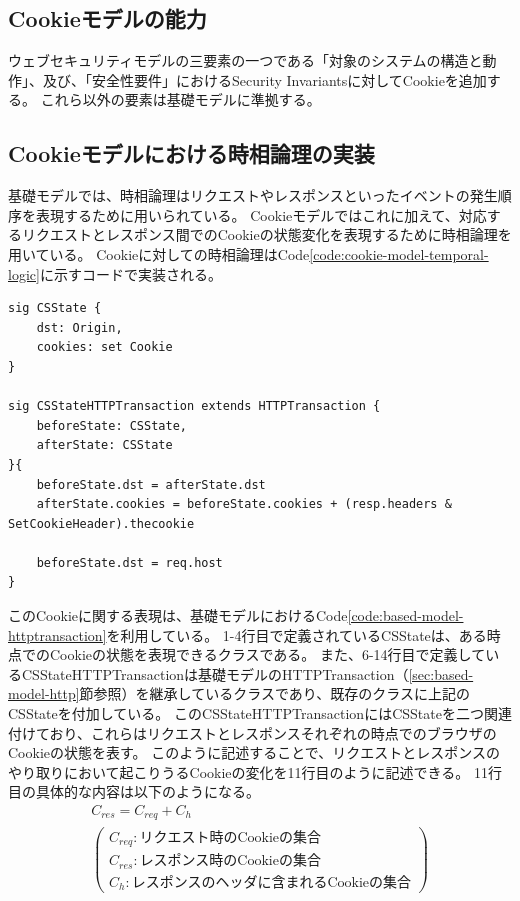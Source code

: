 \documentclass[12pt,a4paper]{jbook}
\begin{document}
\subsection{Cookieモデルの能力}
\color{red}
ウェブセキュリティモデルの三要素の一つである「対象のシステムの構造と動作」、及び、「安全性要件」におけるSecurity Invariantsに対してCookieを追加する。
これら以外の要素は基礎モデル\cite{based-model}に準拠する。
\color{black}

\subsection{Cookieモデルにおける時相論理の実装}
基礎モデルでは、時相論理はリクエストやレスポンスといったイベントの発生順序を表現するために用いられている。
Cookieモデルではこれに加えて、対応するリクエストとレスポンス間でのCookieの状態変化を表現するために時相論理を用いている。
Cookieに対しての時相論理はCode\ref{code:cookie-model-temporal-logic}に示すコードで実装される。
\begin{lstlisting}[caption=Cookieに対する時相論理, label=code:cookie-model-temporal-logic]
sig CSState {
	dst: Origin,
	cookies: set Cookie
}

sig CSStateHTTPTransaction extends HTTPTransaction {
	beforeState: CSState,
	afterState: CSState
}{
	beforeState.dst = afterState.dst
	afterState.cookies = beforeState.cookies + (resp.headers & SetCookieHeader).thecookie
	
	beforeState.dst = req.host
}
\end{lstlisting}
このCookieに関する表現は、基礎モデルにおけるCode\ref{code:based-model-httptransaction}を利用している。
1-4行目で定義されているCSStateは、ある時点でのCookieの状態を表現できるクラスである。
また、6-14行目で定義しているCSStateHTTPTransactionは基礎モデルのHTTPTransaction（\ref{sec:based-model-http}節参照）を継承しているクラスであり、既存のクラスに上記のCSStateを付加している。
このCSStateHTTPTransactionにはCSStateを二つ関連付けており、これらはリクエストとレスポンスそれぞれの時点でのブラウザのCookieの状態を表す。
このように記述することで、リクエストとレスポンスのやり取りにおいて起こりうるCookieの変化を11行目のように記述できる。
11行目の具体的な内容は以下のようになる。
\begin{eqnarray*}
& C_{res} = C_{req} + C_{h} &\\
& \left(
\begin{array}{l}
	C_{req} : \mbox{リクエスト時のCookieの集合}\\
	C_{res} : \mbox{レスポンス時のCookieの集合}\\
	C_{h} : \mbox{レスポンスのヘッダに含まれるCookieの集合}
\end{array}
\right) &
\end{eqnarray*}
\end{document}
